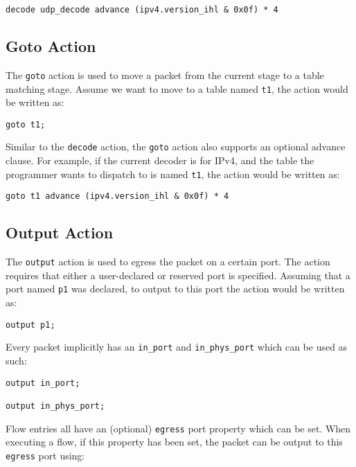 \begin{lstlisting}
decode udp_decode advance (ipv4.version_ihl & 0x0f) * 4
\end{lstlisting}

\subsection{Goto Action} \label{goto_action_tut}

The \texttt{goto} action is used to move a packet from the current stage to a table matching stage. Assume we want to move to a table named \texttt{t1}, the action would be written as:

\begin{lstlisting}
goto t1;
\end{lstlisting}

Similar to the \texttt{decode} action, the \texttt{goto} action also supports an optional advance clause. For example, if the current decoder is for IPv4, and the table the programmer wants to dispatch to is named \texttt{t1}, the action would be written as:

\begin{lstlisting}
goto t1 advance (ipv4.version_ihl & 0x0f) * 4
\end{lstlisting}

\subsection{Output Action} \label{output_action_tut}

The \texttt{output} action is used to egress the packet on a certain port. The action requires that either a user-declared or reserved port is specified. Assuming that a port named \texttt{p1} was declared, to output to this port the action would be written as:

\begin{lstlisting}
output p1;
\end{lstlisting}

Every packet implicitly has an \texttt{in\_port} and \texttt{in\_phys\_port} which can be used as such:

\begin{lstlisting}
output in_port;

output in_phys_port;
\end{lstlisting}

Flow entries all have an (optional) \texttt{egress} port property which can be set. When executing a flow, if this property has been set, the packet can be output to this \texttt{egress} port using:

